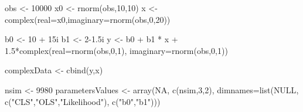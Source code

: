 \documentclass[
]{book}
\newenvironment{Shaded}{\begin{snugshade}}{\end{snugshade}}
\newcommand{\AttributeTok}[1]{\textcolor[rgb]{0.77,0.63,0.00}{#1}}
\newcommand{\ConstantTok}[1]{\textcolor[rgb]{0.00,0.00,0.00}{#1}}
\newcommand{\DecValTok}[1]{\textcolor[rgb]{0.00,0.00,0.81}{#1}}
\newcommand{\FloatTok}[1]{\textcolor[rgb]{0.00,0.00,0.81}{#1}}
\newcommand{\FunctionTok}[1]{\textcolor[rgb]{0.00,0.00,0.00}{#1}}
\newcommand{\NormalTok}[1]{#1}
\newcommand{\OtherTok}[1]{\textcolor[rgb]{0.56,0.35,0.01}{#1}}
\newcommand{\SpecialCharTok}[1]{\textcolor[rgb]{0.00,0.00,0.00}{#1}}
\newcommand{\StringTok}[1]{\textcolor[rgb]{0.31,0.60,0.02}{#1}}
\begin{document}
\begin{Shaded}
\begin{Highlighting}[]
\NormalTok{obs }\OtherTok{\textless{}{-}} \DecValTok{10000}
\NormalTok{x0 }\OtherTok{\textless{}{-}} \FunctionTok{rnorm}\NormalTok{(obs,}\DecValTok{10}\NormalTok{,}\DecValTok{10}\NormalTok{)}
\NormalTok{x }\OtherTok{\textless{}{-}} \FunctionTok{complex}\NormalTok{(}\AttributeTok{real=}\NormalTok{x0,}\AttributeTok{imaginary=}\FunctionTok{rnorm}\NormalTok{(obs,}\DecValTok{0}\NormalTok{,}\DecValTok{20}\NormalTok{))}

\NormalTok{b0 }\OtherTok{\textless{}{-}} \DecValTok{10} \SpecialCharTok{+}\NormalTok{ 15i}
\NormalTok{b1 }\OtherTok{\textless{}{-}} \DecValTok{2}\FloatTok{{-}1.5}\NormalTok{i}
\NormalTok{y }\OtherTok{\textless{}{-}}\NormalTok{ b0 }\SpecialCharTok{+}\NormalTok{ b1 }\SpecialCharTok{*}\NormalTok{ x }\SpecialCharTok{+} \FloatTok{1.5}\SpecialCharTok{*}\FunctionTok{complex}\NormalTok{(}\AttributeTok{real=}\FunctionTok{rnorm}\NormalTok{(obs,}\DecValTok{0}\NormalTok{,}\DecValTok{1}\NormalTok{),}
                               \AttributeTok{imaginary=}\FunctionTok{rnorm}\NormalTok{(obs,}\DecValTok{0}\NormalTok{,}\DecValTok{1}\NormalTok{))}

\NormalTok{complexData }\OtherTok{\textless{}{-}} \FunctionTok{cbind}\NormalTok{(y,x)}

\NormalTok{nsim }\OtherTok{\textless{}{-}} \DecValTok{9980}
\NormalTok{parametersValues }\OtherTok{\textless{}{-}}
    \FunctionTok{array}\NormalTok{(}\ConstantTok{NA}\NormalTok{, }\FunctionTok{c}\NormalTok{(nsim,}\DecValTok{3}\NormalTok{,}\DecValTok{2}\NormalTok{),}
          \AttributeTok{dimnames=}\FunctionTok{list}\NormalTok{(}\ConstantTok{NULL}\NormalTok{,}
                        \FunctionTok{c}\NormalTok{(}\StringTok{"CLS"}\NormalTok{,}\StringTok{"OLS"}\NormalTok{,}\StringTok{"Likelihood"}\NormalTok{),}
                        \FunctionTok{c}\NormalTok{(}\StringTok{"b0"}\NormalTok{,}\StringTok{"b1"}\NormalTok{)))}


\end{Highlighting}
\end{Shaded}
\end{document}
